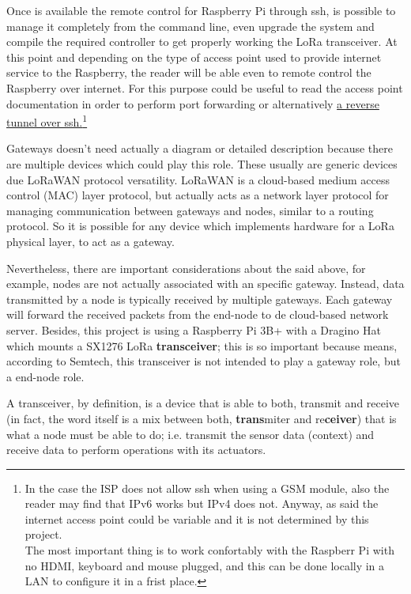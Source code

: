 \documentclass[11pt,a4paper,dvipsnames,twoside]{article}
\newcounter{subsubsubsection}[subsubsection]
\begin{document}
Once is available the remote control for Raspberry Pi through ssh, is possible to manage it completely from the command line, even upgrade the system and compile the required controller to get properly working the LoRa transceiver. At this point and depending on the type of access point used to provide internet service to the Raspberry, the reader will be able even to remote control the Raspberry over internet. For this purpose could be useful to read the access point documentation in order to perform port forwarding or alternatively \href{http://www.thirdway.ch/En/projects/raspberry_pi_3g/index.php}{a reverse tunnel over ssh.}\footnote{In the case the ISP does not allow ssh when using a GSM module, also the reader may find that IPv6 works but IPv4 does not. Anyway, as said the internet access point could be variable and it is not determined by this project.\\ The most important thing is to work confortably with the Raspberr Pi with no HDMI, keyboard and mouse plugged, and this can be done locally in a LAN to configure it in a frist place.}  

Gateways doesn't need actually a diagram or detailed description because there are multiple devices which could play this role. These usually are generic devices due LoRaWAN protocol versatility. LoRaWAN is a cloud-based medium access control (MAC) layer protocol, but actually acts as a network layer protocol for managing communication between gateways and nodes, similar to a routing protocol. So it is possible for any device which implements hardware for a LoRa physical layer, to act as a gateway.

Nevertheless, there are important considerations about the said above, for example, nodes are not actually associated with an specific gateway. Instead, data transmitted by a node is typically received by multiple gateways. Each gateway will forward the received packets from the end-node to de cloud-based network server. Besides, this project is using a Raspberry Pi 3B+ with a Dragino Hat which mounts a SX1276 LoRa \textbf{transceiver}\cite{SX1276}; this is so important because means, according to Semtech, this transceiver is not intended to play a gateway role, but a end-node role.

A transceiver, by definition, is a device that is able to both, transmit and receive (in fact, the word itself is a mix between both, \textbf{trans}miter and re\textbf{ceiver}) that is what a node must be able to do; i.e. transmit the sensor data (context) and receive data to perform operations with its actuators. 
\end{document}
